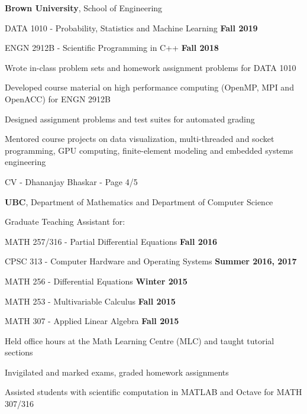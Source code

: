 \documentclass[margin,line]{res}
\newenvironment{list1}{
  \begin{list}{\ding{113}}{
      \setlength{\itemsep}{0in}
      \setlength{\parsep}{0in} \setlength{\parskip}{0in}
      \setlength{\topsep}{0in} \setlength{\partopsep}{0in}
      \setlength{\leftmargin}{0.17in}}}{\end{list}}
\newenvironment{list3}{
  \begin{list}{\textopenbullet}{
      \setlength{\itemsep}{0in}
      \setlength{\parsep}{0in} \setlength{\parskip}{0in}
      \setlength{\topsep}{0in} \setlength{\partopsep}{0in}
      \setlength{\leftmargin}{0.1in}}}{\end{list}}
\begin{document}
\begin{resume}
{\bf Brown University}, School of Engineering\\
\vspace*{-.2cm}
\begin{list1}
\setlength\itemsep{0.25em}
\item[] DATA 1010 - Probability, Statistics and Machine Learning \hfill {\bf Fall 2019}
\item[] ENGN 2912B - Scientific Programming in C++ \hfill {\bf Fall 2018}\\
\begin{list3}
\vspace*{-.1cm}
\setlength\itemsep{0.25em}
\item Wrote in-class problem sets and homework assignment problems for DATA 1010
\item Developed course material on high performance computing (OpenMP, MPI and OpenACC) for ENGN 2912B
\item Designed assignment problems and test suites for automated grading
\item Mentored course projects on data visualization, multi-threaded and socket programming, GPU computing, finite-element modeling and embedded systems engineering
\end{list3}
\end{list1}

\newpage
\begin{flushright}
CV - Dhananjay Bhaskar - Page 4/5
\end{flushright}
\vspace*{.2cm}

{\bf UBC}, Department of Mathematics and Department of Computer Science\\
\vspace*{-.2cm}
\begin{list1}
\setlength\itemsep{0.25em}
\item[] Graduate Teaching Assistant for:\\[-0.1cm]
\item[] MATH 257/316 - Partial Differential Equations \hfill {\bf Fall 2016}
\item[] CPSC 313 - Computer Hardware and Operating Systems \hfill {\bf Summer 2016, 2017}
\item[] MATH 256 - Differential Equations \hfill {\bf Winter 2015}
\item[] MATH 253 - Multivariable Calculus \hfill {\bf Fall 2015}
\item[] MATH 307 - Applied Linear Algebra \hfill {\bf Fall 2015}\\
\begin{list3}
\vspace*{-.1cm}
\setlength\itemsep{0.25em}
\item Held office hours at the Math Learning Centre (MLC) and taught tutorial sections
\item Invigilated and marked exams, graded homework assignments
\item Assisted students with scientific computation in MATLAB and Octave for MATH 307/316
\end{list3}
\end{list1}
\vspace*{.1cm}


\end{resume}
\end{document}
